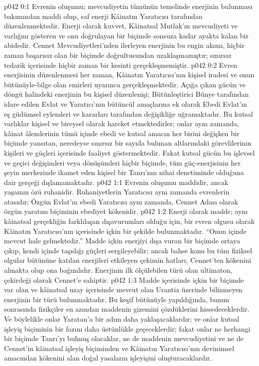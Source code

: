 \vs p042 0:1 Evrenin oluşumu; mevcudiyetin tümünün temelinde enerjinin bulunması bakımından maddi olup, saf enerji Kâinatın Yaratıcısı tarafından düzenlenmektedir. Enerji olarak kuvvet, Kâinatsal Mutlak’ın mevcudiyeti ve varlığını gösteren ve onu doğrulayan bir biçimde sonsuza kadar ayakta kalan bir abidedir. Cennet Mevcudiyetleri’nden ilerleyen enerjinin bu engin akımı, hiçbir zaman başarısız olan bir biçimde doğrultusundan uzaklaşmamıştır; sınırsız tedarik içerisinde hiçbir zaman bir kesinti gerçekleşmemiştir.
\vs p042 0:2 Evren enerjisinin düzenlenmesi her zaman, Kâinatın Yaratıcısı’nın kişisel iradesi ve onun bütünüyle\hyp{}bilge olan emirleri uyarınca gerçekleşmektedir. Açığa çıkan gücün ve döngü halindeki enerjinin bu kişisel düzenlenişi; Bütünleştirici Bünye tarafından idare edilen Evlat ve Yaratıcı’nın bütüncül amaçlarına ek olarak Ebedi Evlat’ın eş güdümsel eylemleri ve kararları tarafından değişikliğe uğramaktadır. Bu kutsal varlıklar kişisel ve bireysel olarak hareket etmektedirler; onlar aynı zamanda, kâinat âlemlerinin tümü içinde ebedi ve kutsal amacın her birini değişken bir biçimde yansıtan, neredeyse sınırsız bir sayıda bulunan altlarındaki görevlilerinin kişileri ve güçleri içerisinde faaliyet göstermektedir. Fakat kutsal gücün bu işlevsel ve geçici değişimleri veya dönüşümleri hiçbir biçimde, tüm güç\hyp{}enerjisinin her şeyin merkezinde ikamet eden kişisel bir Tanrı’nın nihai denetiminde olduğuna dair gerçeği dışlamamaktadır.
\vs p042 1:1 Evrenin oluşumu maddidir, ancak yaşamın özü ruhanidir. Ruhaniyetlerin Yaratıcısı aynı zamanda evrenlerin atasıdır; Özgün Evlat’ın ebedi Yaratıcısı aynı zamanda, Cennet Adası olarak özgün yaratım biçiminin ebediyet kökenidir.
\vs p042 1:2 Enerji olarak madde; aynı kâinatsal gerçekliğin farklılaşan dışavurumları olduğu için, bir evren olgusu olarak Kâinatın Yaratıcısı’nın içerisinde içkin bir şekilde bulunmaktadır. “Onun içinde mevcut hale gelmektedir.” Madde içkin enerjiyi dışa vuran bir biçimde ortaya çıkıp, kendi içinde taşıdığı güçleri sergileyebilir; ancak bahse konu bu tüm fiziksel olgular bütününe katılan enerjileri etkileyen çekimin hatları, Cennet’ten kökenini almakta olup ona bağımlıdır. Enerjinin ilk ölçülebilen türü olan ultimaton, çekirdeği olarak Cennet’e sahiptir.
\vs p042 1:3 Madde içerisinde içkin bir biçimde var olan ve kâinatsal uzay içerisinde mevcut olan Urantia üzerinde bilinmeyen enerjinin bir türü bulunmaktadır. Bu keşif bütünüyle yapıldığında, bunun sonrasında fizikçiler en azından maddenin gizemini çözdüklerini hissedeceklerdir. Ve böylelikle onlar Yaratan’a bir adım daha yaklaşacaklardır; ve onlar kutsal işleyiş biçiminin bir fazını daha üstünlükle geçeceklerdir; fakat onlar ne herhangi bir biçimde Tanrı’yı bulmuş olacaklar, ne de maddenin mevcudiyetini ve ne de Cennet’in kâinatsal işleyiş biçiminden ve Kâinatın Yaratıcısı’nın devinimsel amacından kökenini alan doğal yasaların işleyişini oluşturacaklardır.
